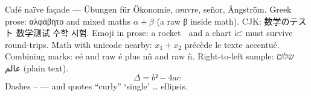 Café naïve façade — Übungen für Ökonomie, œuvre, señor, Ångström.
Greek prose: αλφάβητο and mixed maths $\alpha + β$ (a raw β inside math).
CJK: 数学のテスト 数学测试 수학 시험.
Emoji in prose: a rocket 🚀 and a chart 📈 must survive round-trips.
Math with unicode nearby: $x_1 + x_2$ précède le texte accentué.
Combining marks: e\'{e} and raw é plus n\~{n} and raw ñ.
Right-to-left sample: שלום عالم (plain text).
\begin{equation}
  Δ = b² − 4ac
\end{equation}
Dashes – — and quotes “curly” ‘single’ … ellipsis.

